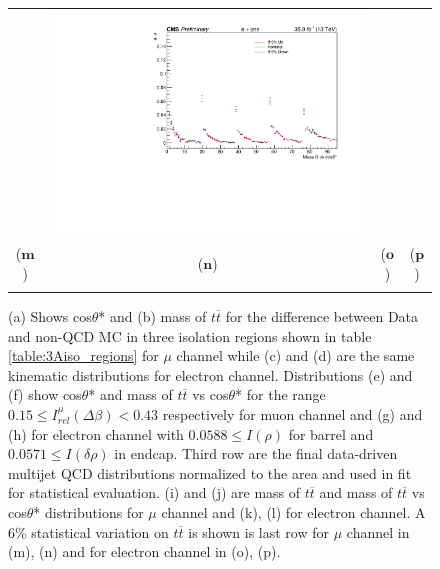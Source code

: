 \begin{figure}[htp]
\begin{tabular}{cccc}
& \hspace{-0.95cm} \includegraphics[scale=0.22]{fig/chapt7/qcd/qcd_e_ch/ttbar_m_cosine_ttsys_6perUpDn.pdf}\\
($\mathbf{m}$)\qquad\qquad&($\mathbf{n}$)\qquad\qquad&($\mathbf{o}$)\qquad\qquad&($\mathbf{p}$)\qquad\qquad\\
\\
\end{tabular}
\caption{(a) Shows cos$\theta$* and (b) mass of $t\overline{t}$ for the difference between Data and non-QCD MC in three isolation regions shown in table \ref{table:3Aiso_regions} for $\mu$ channel while (c) and (d) are the same kinematic distributions for electron channel. Distributions (e) and (f) show cos$\theta$* and mass of $t\overline{t}$ vs cos$\theta$* for the range  $0.15 \leq I_{rel}^{\mu}(\Delta\beta) < 0.43$ respectively for muon channel and (g) and (h) for electron channel with $0.0588 \leq I(\rho)$ for barrel and $0.0571 \leq I(\delta\rho)$ in endcap. Third row are the final data-driven multijet QCD distributions normalized to the area and used in fit for statistical evaluation. (i) and (j) are mass of $t\overline{t}$ and mass of $t\overline{t}$ vs cos$\theta$* distributions for $\mu$ channel and (k), (l) for electron channel. A 6\% statistical variation on $t\overline{t}$ is shown is last row for $\mu$ channel in (m), (n) and for electron channel in (o), (p).}\label{Fig:data_driven_qcd}
\end{figure}


\clearpage{\pagestyle{empty}\cleardoublepage}

